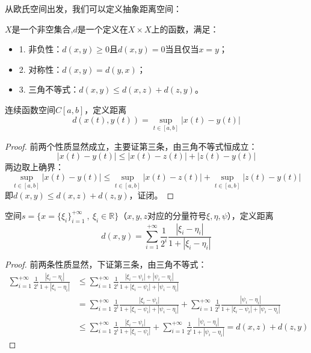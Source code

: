 从欧氏空间出发，我们可以定义抽象距离空间：
\begin{definition}[抽象距离空间] \label{def:Metric}
$X$是一个非空集合,$d$是一个定义在$X \times X$上的函数，满足：
\begin{itemize}
    \item 1. 非负性：$d(x,y) \geq 0$且$d(x,y)=0$当且仅当$x=y$；
    \item 2. 对称性：$d(x,y)=d(y,x)$；
    \item 3. 三角不等式：$d(x,y) \leq d(x,z)+d(z,y)$。
\end{itemize}
\end{definition}
\begin{example} \quad 连续函数空间$C[a,b]$，定义距离
\[d(x(t),y(t))=\mathop{\text{sup}}\limits_{t \in [a,b]}\left|x(t)-y(t)\right|\]
\end{example}
\begin{proof}
前两个性质显然成立，主要证第三条，由三角不等式恒成立：
\[\left|x(t)-y(t)\right| \leq \left|x(t)-z(t)\right|+\left|z(t)-y(t)\right|\]
两边取上确界：
\[\mathop{\text{sup}}\limits_{t \in [a,b]}\left|x(t)-y(t)\right| \leq \mathop{\text{sup}}\limits_{t \in [a,b]}\left|x(t)-z(t)\right|+\mathop{\text{sup}}\limits_{t \in [a,b]}\left|z(t)-y(t)\right|\]
即$d(x,y) \leq d(x,z)+d(z,y)$，证闭。
\end{proof}

\newpage
\begin{example} \quad 空间$s=\{x=\{\xi_i\}_{i=1}^{+\infty} \ , \ \xi_i \in \mathbb{R}\}$（$x,y,z$对应的分量符号$\xi,\eta,\psi$），定义距离
\[d(x,y)=\sum_{i=1}^{+\infty}\frac{1}{2^i}\frac{|\xi_i-\eta_i|}{1+|\xi_i-\eta_i|}\]
\end{example}
\begin{proof}
前两条性质显然，下证第三条，由三角不等式：
\begin{equation*}
\begin{aligned}
\sum_{i=1}^{+\infty}\frac{1}{2^i}\frac{|\xi_i-\eta_i|}{1+|\xi_i-\eta_i|} & \leq \sum_{i=1}^{+\infty}\frac{1}{2^i}\frac{\left|\xi_i-\psi_i\right|+\left|\psi_i-\eta_i\right|}{1+\left|\xi_i-\psi_i\right|+\left|\psi_i-\eta_i\right|} \\
& =\sum_{i=1}^{+\infty}\frac{1}{2^i}\frac{\left|\xi_i-\psi_i\right|}{1+\left|\xi_i-\psi_i\right|+\left|\psi_i-\eta_i\right|}+\sum_{i=1}^{+\infty}\frac{1}{2^i}\frac{\left|\psi_i-\eta_i\right|}{1+\left|\xi_i-\psi_i\right|+\left|\psi_i-\eta_i\right|} \\
& \leq \sum_{i=1}^{+\infty}\frac{1}{2^i}\frac{\left|\xi_i-\psi_i\right|}{1+\left|\xi_i-\psi_i\right|}+\sum_{i=1}^{+\infty}\frac{1}{2^i}\frac{\left|\psi_i-\eta_i\right|}{1+\left|\psi_i-\eta_i\right|}=d(x,z)+d(z,y)
\end{aligned}
\end{equation*}
\end{proof}

